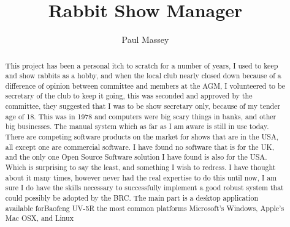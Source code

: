 \documentclass[a4paper,11pt]{report}
\title{Rabbit Show Manager}
\author{Paul Massey}
\begin{document}
\maketitle
\tableofcontents

\begin{abstract}
This project has been a personal itch to scratch for a number of years, I used to keep and show rabbits as a hobby, and when the local club nearly closed down because of a difference of opinion between committee and members at the AGM, I volunteered to be secretary of the club to keep it going, this was seconded and approved by the committee, they suggested that I was to be show secretary only, because of my tender age of 18. This was in 1978 and computers were big scary things in banks, and other big businesses.\newline 
The manual system which as far as I am aware is still in use today. There are competing software products on the market for shows that are in the USA, all except one are commercial software. I have found no software that is for the UK, and the only one Open Source Software solution I have found is also for the USA. Which is surprising to say the least, and something I wish to redress. I have thought about it many times, however never had the real expertise to do this until now, I am sure I do have the skills necessary to successfully implement a good robust system that could possibly be adopted by the BRC.\newline
The main part is a desktop application available forBaofeng UV-5R the most common platforms Microsoft's Windows, Apple's Mac OSX, and Linux\newline
\end{abstract}
\end{document}
